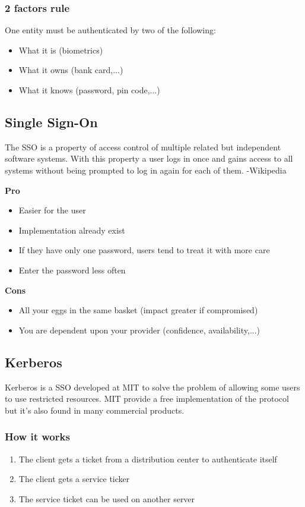 \subsubsection{2 factors rule}
One entity must be authenticated by two of the following:
\begin{itemize}
\item What it is (biometrics)
\item What it owns (bank card,...)
\item What it knows (password, pin code,...)
\end{itemize}

\subsection{Single Sign-On}
The SSO is a property of access control of multiple related but independent software systems. With this property a user logs in once and gains access to all systems without being prompted to log in again for each of them. -Wikipedia

\textbf{Pro}
\begin{itemize}
\item Easier for the user
\item Implementation already exist
\item If they have only one password, users tend to treat it with more care
\item Enter the password less often
\end{itemize}

\textbf{Cons}
\begin{itemize}
\item All your eggs in the same basket (impact greater if compromised)
\item You are dependent upon your provider (confidence, availability,...)
\end{itemize}

\subsection{Kerberos}
Kerberos is a SSO developed at MIT to solve the problem of allowing
some users to use restricted resources. MIT provide a free
implementation of the protocol but it's also found in many commercial
products.

\subsubsection*{How it works}
\begin{enumerate}
\item The client gets a ticket from a distribution center to authenticate itself
\item The client gets a service ticker
\item The service ticket can be used on another server
\end{enumerate}
